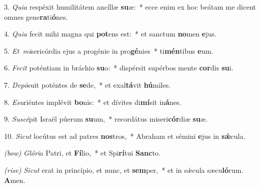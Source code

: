 3. \textit{Quia} respéxit humilitátem ancíllæ \textbf{su}æ:~* ecce enim ex hoc beátam me dicent omnes gene\textbf{ra}ti\textbf{ó}nes.

4. \textit{Quia} fecit mihi magna qui \textbf{pot}ens est:~* et sanctum \textbf{no}men \textbf{e}jus.

5. \textit{Et\ mi}sericórdia ejus a progénie in pro\textbf{gé}nies~* ti\textbf{mén}tibus \textbf{e}um.

6. \textit{Fecit} poténtiam in bráchio \textbf{su}o:~* dispérsit supérbos mente \textbf{cor}dis \textbf{su}i.

7. \textit{Depó}suit poténtes de \textbf{se}de,~* et exal\textbf{tá}vit \textbf{hú}miles.

8. \textit{Esu}riéntes implévit \textbf{bo}nis:~* et dívites di\textbf{mí}sit in\textbf{á}nes.

9. \textit{Suscé}pit Israël púerum \textbf{su}um,~* recordátus miseri\textbf{cór}diæ \textbf{su}æ.

10. \textit{Sicut} locútus est ad patres \textbf{nos}tros,~* Abraham et sémini \textbf{e}jus in \textbf{s\'{\ae}}cula.

\textit{(bow)} \textit{Glóri}a Patri, et \textbf{Fí}lio,~* et Spi\textbf{rí}tui \textbf{Sanc}to.

\textit{(rise)} \textit{Sicut} erat in princípio, et nunc, et \textbf{sem}per,~* et in s\'{\ae}cula sæcu\textbf{ló}rum. \textbf{A}men.